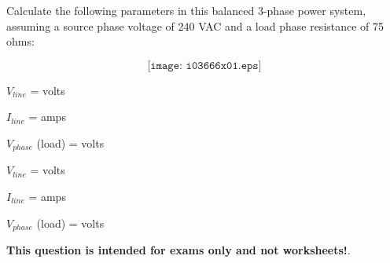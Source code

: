 

Calculate the following parameters in this balanced 3-phase power system, assuming a source phase voltage of 240 VAC and a load phase resistance of 75 ohms:

$$\texttt{[image: i03666x01.eps]}$$

$V_{line}$ = \underbar{\hskip 50pt} volts

\vskip 10pt

$I_{line}$ = \underbar{\hskip 50pt} amps

\vskip 10pt

$V_{phase}$ (load) = \underbar{\hskip 50pt} volts







$V_{line}$ =  volts

$I_{line}$ =  amps

$V_{phase}$ (load) =  volts







{\bf This question is intended for exams only and not worksheets!}.



